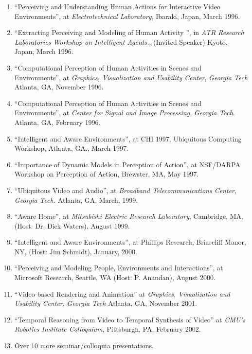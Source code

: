 \begin{enumerate}
\item ``Perceiving and Understanding Human Actions for Interactive Video
Environments'', at \textit{Electrotechnical Laboratory}, Ibaraki, Japan, March 1996.

\item ``Extracting Perceiving and Modeling of Human Activity '', in \textit{ATR Research Laboratories Workshop on Intelligent Agents.}, (Invited
Speaker) Kyoto, Japan, March 1996.

\item ``Computational Perception of Human Activities in Scenes and Environments'',
at \textit{Graphics, Visualization and Usability Center}, \textit{Georgia Tech} Atlanta, GA, November 1996.

\item ``Computational Perception of Human Activities in Scenes and Environments'',
at \textit{Center for Signal and Image Processing}, \textit{Georgia Tech}. Atlanta, GA, February 1996.

\item ``Intelligent and Aware Environments'', at CHI 1997, Ubiquitous Computing
Workshop, Atlanta, GA., March 1997.

\item ``Importance of Dynamic Models in Perception of Action'', at NSF/DARPA
Workshop on Perception of Action, Brewster, MA, May 1997.

\item ``Ubiquitous Video and Audio'', at \textit{Broadband Telecommunications Center, Georgia Tech.} Atlanta, GA, March, 1999.

\item ``Aware Home'', at \textit{Mitsubishi Electric Research Laboratory}, Cambridge, MA, (Host: Dr. Dick Waters), August 1999.

\item ``Intelligent and Aware Environments'', at Phillips Research, Briarcliff
Manor, NY, (Host: Jim Schmidt), January, 2000.

\item ``Perceiving and Modeling People, Environments and Interactions'', at
Microsoft Research, Seattle, WA (Host: P. Anandan), August 2000.

\item ``Video-based Rendering and Animation'' at \textit{Graphics, Visualization and Usability Center}, \textit{Georgia Tech} Atlanta, GA, November 2001.

\item ``Temporal Reasoning from Video to Temporal Synthesis of Video'' at  \textit{CMU's Robotics Institute Colloquium}, Pittsburgh, PA, February 2002.

\item Over 10 more seminar/colloquia presentations.

\end{enumerate}


